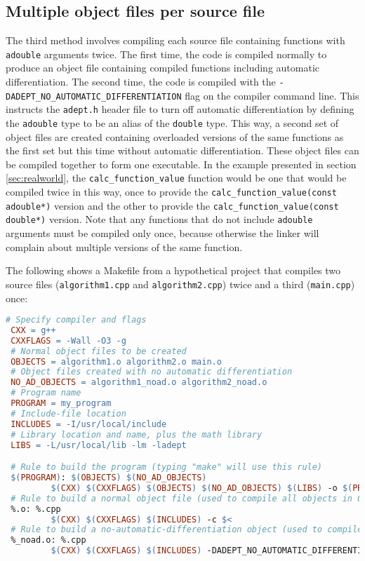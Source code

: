 \documentclass[a4,oneside]{book}
\def\codesize{\small}
\def\code#1{{\codesize\texttt{#1}}}
\begin{document}
\subsection{Multiple object files per source file}
\label{sec:multipleobjects}
The third method involves compiling each source file containing
functions with \code{adouble} arguments twice.  The first time, the
code is compiled normally to produce an object file containing
compiled functions including automatic differentiation. The second
time, the code is compiled with the
\code{-DADEPT\_NO\_AUTOMATIC\_DIFFERENTIATION} flag on the compiler
command line. This instructs the \code{adept.h} header file to turn
off automatic differentiation by defining the \code{adouble} type to
be an alias of the \code{double} type. This way, a second set of
object files are created containing overloaded versions of the same
functions as the first set but this time without automatic
differentiation. These object files can be compiled together to form
one executable.  In the example presented in section
\ref{sec:realworld}, the \code{calc\_function\_value} function would
be one that would be compiled twice in this way, once to provide the
\code{calc\_function\_value(const adouble*)} version and the other to
provide the \code{calc\_function\_value(const double*)} version. Note
that any functions that do not include \code{adouble} arguments must
be compiled only once, because otherwise the linker will complain
about multiple versions of the same function.

The following shows a Makefile from a hypothetical project that
compiles two source files (\code{algorithm1.cpp} and
\code{algorithm2.cpp}) twice and a third (\code{main.cpp}) once:
%
\begin{lstlisting}[language=make]
 # Specify compiler and flags
 CXX = g++
 CXXFLAGS = -Wall -O3 -g
 # Normal object files to be created
 OBJECTS = algorithm1.o algorithm2.o main.o
 # Object files created with no automatic differentiation
 NO_AD_OBJECTS = algorithm1_noad.o algorithm2_noad.o
 # Program name
 PROGRAM = my_program
 # Include-file location
 INCLUDES = -I/usr/local/include
 # Library location and name, plus the math library
 LIBS = -L/usr/local/lib -lm -ladept

 # Rule to build the program (typing "make" will use this rule)
 $(PROGRAM): $(OBJECTS) $(NO_AD_OBJECTS)
         $(CXX) $(CXXFLAGS) $(OBJECTS) $(NO_AD_OBJECTS) $(LIBS) -o $(PROGRAM)
 # Rule to build a normal object file (used to compile all objects in OBJECTS)
 %.o: %.cpp
         $(CXX) $(CXXFLAGS) $(INCLUDES) -c $<
 # Rule to build a no-automatic-differentiation object (used to compile ones in NO_AD_OBJECTS)
 %_noad.o: %.cpp
         $(CXX) $(CXXFLAGS) $(INCLUDES) -DADEPT_NO_AUTOMATIC_DIFFERENTIATION -c $< -o $@
\end{lstlisting}
%
\end{document}
